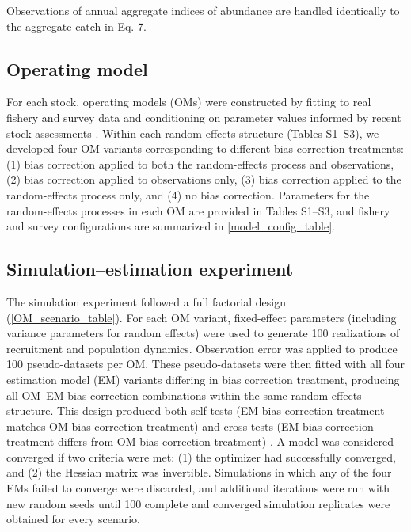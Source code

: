\documentclass[
  12pt,
]{article}
\begin{document}
Observations of annual aggregate indices of abundance are handled
identically to the aggregate catch in Eq. 7.

\hypertarget{operating-model}{%
\subsection{Operating model}\label{operating-model}}

For each stock, operating models (OMs) were constructed by fitting to
real fishery and survey data and conditioning on parameter values
informed by recent stock assessments
\citep[e.g.,][]{nefsc2019haddock, nefsc2021mackerel, nefmc2023flounder}.
Within each random-effects structure (Tables S1--S3), we developed four
OM variants corresponding to different bias correction treatments: (1)
bias correction applied to both the random-effects process and
observations, (2) bias correction applied to observations only, (3) bias
correction applied to the random-effects process only, and (4) no bias
correction. Parameters for the random-effects processes in each OM are
provided in Tables S1--S3, and fishery and survey configurations are
summarized in \autoref{model_config_table}.

\hypertarget{simulationestimation-experiment}{%
\subsection{Simulation--estimation
experiment}\label{simulationestimation-experiment}}

The simulation experiment followed a full factorial design
(\autoref{OM_scenario_table}). For each OM variant, fixed-effect
parameters (including variance parameters for random effects) were used
to generate 100 realizations of recruitment and population dynamics.
Observation error was applied to produce 100 pseudo-datasets per OM.
These pseudo-datasets were then fitted with all four estimation model
(EM) variants differing in bias correction treatment, producing all
OM--EM bias correction combinations within the same random-effects
structure. This design produced both self-tests (EM bias correction
treatment matches OM bias correction treatment) and cross-tests (EM bias
correction treatment differs from OM bias correction treatment)
\citep{Deroba2015}. A model was considered converged if two criteria
were met: (1) the optimizer had successfully converged, and (2) the
Hessian matrix was invertible. Simulations in which any of the four EMs
failed to converge were discarded, and additional iterations were run
with new random seeds until 100 complete and converged simulation
replicates were obtained for every scenario.
\end{document}
